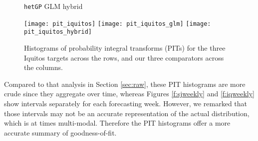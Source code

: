 \documentclass[12pt]{article}
\begin{document}
\begin{figure}[ht!]
\centering
\hspace{3cm} {\tt hetGP} \hfill GLM \hfill hybrid \hspace{3cm}

\texttt{[image: pit\_iquitos]}
\texttt{[image: pit\_iquitos\_glm]}
\texttt{[image: pit\_iquitos\_hybrid]}
\caption{Histograms of probability integral transforms (PITs) for the three
Iquitos targets across the rows, and our three comparators across the columns.}
\label{f:pitiq}
\end{figure}  

Compared to that analysis in Section \ref{sec:raw}, these PIT histograms are
more crude since they aggregate over time, whereas Figures \ref{f:sjweekly}
and \ref{f:iqweekly} show intervals separately for each forecasting week.
However, we remarked that those intervals may not be an accurate
representation of the actual distribution, which is at times multi-modal.
Therefore the PIT histograms offer a more accurate summary of goodness-of-fit.

\clearpage



\end{document}
